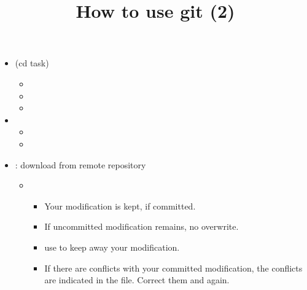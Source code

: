 \documentclass[12pt]{article}
\begin{document}
\title{How to use git (2)}
\begin{itemize}
\item
{} (cd task)
\begin{itemize}
\item
{}
\item
{}
\item
{}
\end{itemize}
\item
{}
\begin{itemize}
\item
{}
\item
{}
\end{itemize}
\item
{}: download from remote repository
\begin{itemize}
\item
{}
\begin{itemize}
\item
Your modification is kept, if committed.
\item
If uncommitted modification remains, no overwrite.
\item
use  to keep away your modification.
\item
If there are conflicts with your committed modification, the conflicts
are indicated in the file. Correct them and  again.
\end{itemize}
\end{itemize}
\end{itemize}
\end{document}

